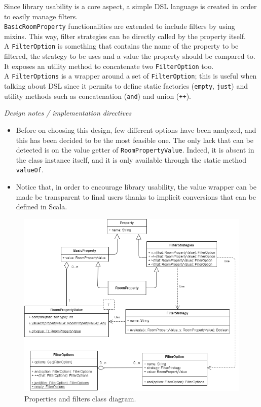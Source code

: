 \bigskip
Since library usability is a core aspect, a simple DSL language is created in order to easily manage filters.
\\
\texttt{BasicRoomProperty} functionalities are extended to include filters by using mixins. This way, filter strategies can be directly called by the property itself.
\\
A \texttt{FilterOption} is something that contains the name of the property to be filtered, the strategy to be uses and a value the property should be compared to. It exposes an utility method to concatenate two \texttt{FilterOption} too.
\\
A \texttt{FilterOptions} is a wrapper around a set of \texttt{FilterOption}; this is useful when talking about DSL since it permits to define static factories (\texttt{empty}, \texttt{just}) and utility methods such as concatenation (\texttt{and}) and union (\texttt{++}).

\bigskip
\textit{Design notes / implementation directives}
\\
\begin{itemize}
\item Before on choosing this design, few different options have been analyzed, and this has been decided to be the most feasible one. The only lack that can be detected is on the value getter of \texttt{RoomPropertyValue}. Indeed, it is absent in the class instance itself, and it is only available through the static method \texttt{valueOf}.
\item Notice that, in order to encourage library usability, the value wrapper can be made be transparent to final users thanks to implicit conversions that can be defined in Scala.
\end{itemize}

\begin{figure}[h]
	\hspace*{-0.1in}
	\includegraphics[scale=0.55]{images/4-design/property_and_filters-class.png}
	\caption{Properties and filters class diagram.}
	\label{fig:property-class}
\end{figure}


